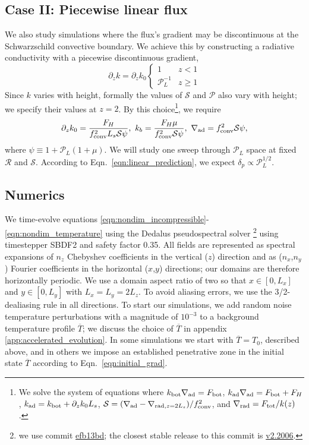 \documentclass[twocolumn]{aastex631}
\newcommand{\gradrad}{\ensuremath{\nabla_{\rm{rad}}}}
\newcommand{\gradad}{\ensuremath{\nabla_{\rm{ad}}}}
\newcommand{\justgrad}{\ensuremath{\nabla}}
\newcommand{\mP}{\ensuremath{\mathcal{P}}}
\newcommand{\mR}{\ensuremath{\mathcal{R}}}
\newcommand{\mS}{\ensuremath{\mathcal{S}}}
\renewcommand{\bar}[1]{\overline{#1}}
\begin{document}
\subsection{Case II: Piecewise linear flux}
We also study simulations where the flux's gradient may be discontinuous at the Schwarzschild convective boundary.
We achieve this by constructing a radiative conductivity with a piecewise discontinuous gradient,
\begin{equation}
\partial_z k = \partial_z k_0
\begin{cases}
1	&	z < 1 \\
\mP_L^{-1} &	z \geq 1
\end{cases}
\label{eqn:sim_linear_k}
\end{equation}
Since $k$ varies with height, formally the values of $\mS$ and $\mP$ also vary with height; we specify their values at $z = 2$.
By this choice\footnote{
We solve the system of equations where ${k_{\rm{bot}}\gradad = F_{\rm{bot}}}$, ${k_{\rm{ad}}\gradad = F_{\rm{bot}} + F_H}$, ${k_{\rm{ad}} = k_{\rm{bot}} + \partial_z k_0 L_s}$, ${\mS = (\gradad - \justgrad_{\mathrm{rad},z=2L_s})/f_{\rm{conv}}^2}$, and ${\gradrad = F_{\rm{tot}}/k(z)}$.
}, we require
\begin{equation}
\partial_z k_0 = \frac{F_{H}}{f_{\rm{conv}}^2L_s \mS \psi},\,\,
k_b = \frac{F_H \mu}{f_{\rm{conv}}^2\mS\psi},\,\,
\gradad = f_{\rm{conv}}^2 \mS \psi,
\end{equation}
where $\psi \equiv 1 + \mP_L(1 + \mu)$.
We will study one sweep through $\mP_L$ space at fixed $\mR$ and $\mS$.
According to Eqn.~\ref{eqn:linear_prediction}, we expect $\delta_p \propto \mP_L^{1/2}$.

\subsection{Numerics}
\label{sct:numerics}
We time-evolve equations \ref{eqn:nondim_incompressible}-\ref{eqn:nondim_temperature} using the Dedalus pseudospectral solver \citep{burns_etal_2020}\footnote{we use commit \href{https://github.com/DedalusProject/dedalus/commit/efb13bdaa09816dde3eee897bc2a15fc284ea2f1}{efb13bd}; the closest stable release to this commit is \href{https://github.com/DedalusProject/dedalus/releases/tag/v2.2006}{v2.2006}.} using timestepper SBDF2 \citep{wang&ruuth2008} and safety factor 0.35.
All fields are represented as spectral expansions of $n_z$ Chebyshev coefficients in the vertical ($z$) direction and as ($n_x$,$n_y$) Fourier coefficients in the horizontal ($x$,$y$) directions; our domains are therefore horizontally periodic.
We use a domain aspect ratio of two so that $x \in [0, L_x]$ and $y \in [0, L_y]$ with $L_x = L_y = 2 L_z$.
To avoid aliasing errors, we use the 3/2-dealiasing rule in all directions.
To start our simulations, we add random noise temperature perturbations with a magnitude of $10^{-3}$ to a background temperature profile $\overline{T}$; we discuss the choice of $\overline{T}$ in appendix \ref{app:accelerated_evolution}.
In some simulations we start with $\bar{T} = T_0$, described above, and in others we impose an established penetrative zone in the initial state $\bar{T}$ according to Eqn.~\ref{eqn:initial_grad}.
\end{document}

